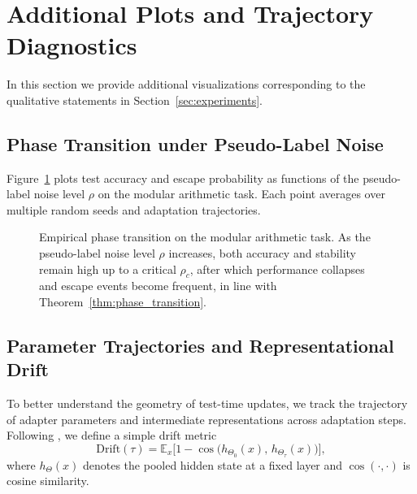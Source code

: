 \documentclass{article}
\theoremstyle{plain}
\theoremstyle{definition}
\theoremstyle{remark}
\newcommand{\E}{\mathbb{E}}
\begin{document}
\section{Additional Plots and Trajectory Diagnostics}
\label{app:plots}

In this section we provide additional visualizations corresponding to the qualitative statements in Section~\ref{sec:experiments}.

\subsection{Phase Transition under Pseudo-Label Noise}

Figure~\ref{fig:app-phase-transition} plots test accuracy and escape probability as functions of the pseudo-label noise level $\rho$ on the modular arithmetic task. Each point averages over multiple random seeds and adaptation trajectories.

\begin{figure}[h]
    \centering
    \caption{Empirical phase transition on the modular arithmetic task. As the pseudo-label noise level $\rho$ increases, both accuracy and stability remain high up to a critical $\rho_c$, after which performance collapses and escape events become frequent, in line with Theorem~\ref{thm:phase_transition}.}
    \label{fig:app-phase-transition}
\end{figure}

\subsection{Parameter Trajectories and Representational Drift}

To better understand the geometry of test-time updates, we track the trajectory of adapter parameters and intermediate representations across adaptation steps. Following \citet{wu2024representational}, we define a simple drift metric
\[
\mathrm{Drift}(\tau)
=
\E_{x}
\Big[
1 - \cos\big(h_{\Theta_0}(x),\, h_{\Theta_\tau}(x)\big)
\Big],
\]
where $h_{\Theta}(x)$ denotes the pooled hidden state at a fixed layer and $\cos(\cdot,\cdot)$ is cosine similarity.
\end{document}
